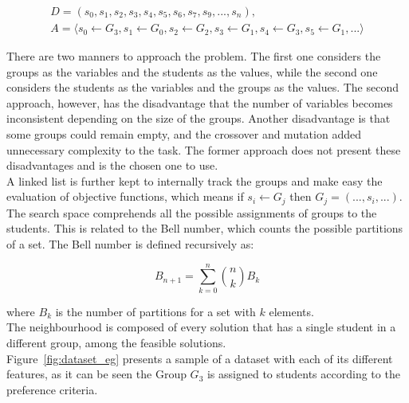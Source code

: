 \begin{equation}
  \label{eq:students_groups}
  \begin{gathered}
        D = (s_0,s_1,s_2,s_3,s_4,s_5,s_6,s_7,s_9,...,s_n),\\
        A = \langle s_0 \leftarrow G_3, s_1 \leftarrow G_0, s_2 \leftarrow G_2,     s_3 \leftarrow G_1, s_4 \leftarrow G_3, s_5 \leftarrow G_1,...  \rangle
  \end{gathered}
\end{equation}


There are two manners to approach the problem. The first one considers the groups as the variables and the students as the values, while the second one considers the students as the variables and the groups as the values. The second approach, however, has the disadvantage that the number of variables becomes inconsistent depending on the size of the groups. Another disadvantage is that some groups could remain empty, and the crossover and mutation added unnecessary complexity to the task. The former approach does not present these disadvantages and is the chosen one to use.\\

A linked list is further kept to internally track the groups and make easy the evaluation of objective functions, which means if $s_i \leftarrow G_j$ then $G_j = (...,s_i,...)$.\\


The search space comprehends all the possible assignments of groups to the students. This is related to the Bell number, which counts the possible partitions of a set. The Bell number is defined recursively as:

\begin{equation}
    B_{n+1} = \sum_{k=0}^n \binom{n}{k}  B_k
\end{equation}

\noindet where $B_k$ is the number of partitions for a set with $k$ elements.\\

The neighbourhood is composed of every solution that has a single student in a different group, among the feasible solutions.\\

Figure~\ref{fig:dataset_eg} presents a sample of a dataset with each of its different features, as it can be seen the Group $G_3$ is assigned to students according to the preference criteria.\\

